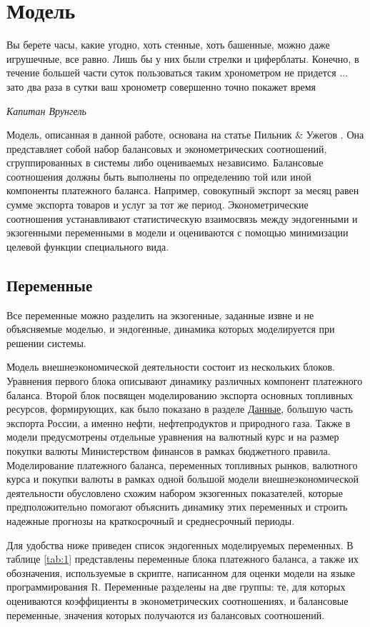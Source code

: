 \documentclass[a4paper, 14pt]{extarticle}
\begin{document}
\newpage
\section{Модель}
\epigraph{Вы берете часы, какие угодно, хоть стенные, хоть башенные, можно даже игрушечные, все равно. Лишь бы у них были стрелки и циферблаты. Конечно, в течение большей части суток пользоваться таким хронометром не придется ... зато два раза в сутки ваш хронометр совершенно точно покажет время}{\textit{Капитан Врунгель}}
Модель, описанная в данной работе, основана на статье Пильник $\&$ Ужегов \autocite{пильник2017модель}. 
Она представляет собой набор балансовых и эконометрических соотношений, сгруппированных в системы либо оцениваемых независимо. 
Балансовые соотношения должны быть выполнены по определению той или иной компоненты платежного баланса. 
Например, совокупный экспорт за месяц равен сумме экспорта товаров и услуг за тот же период.
Эконометрические соотношения устанавливают статистическую взаимосвязь между эндогенными и экзогенными переменными в модели и оцениваются с помощью минимизации целевой функции специального вида.

\subsection{Переменные}

Все переменные можно разделить на экзогенные, заданные извне и не объясняемые моделью, и эндогенные, динамика которых моделируется при решении системы.

Модель внешнеэкономической деятельности состоит из нескольких блоков.
Уравнения первого блока описывают динамику различных компонент платежного баланса. 
Второй блок посвящен моделированию экспорта основных топливных ресурсов, формирующих, как было показано в разделе \hyperref[sub:data]{Данные}, большую часть экспорта России, а именно нефти, нефтепродуктов и природного газа.
Также в модели предусмотрены отдельные уравнения на валютный курс и на размер покупки валюты Министерством финансов в рамках бюджетного правила.
Моделирование платежного баланса, переменных топливных рынков, валютного курса и покупки валюты в рамках одной большой модели внешнеэкономической деятельности обусловлено схожим набором экзогенных показателей, которые предположительно помогают объяснить динамику этих переменных и строить надежные прогнозы на краткосрочный и среднесрочный периоды.

Для удобства ниже приведен список эндогенных моделируемых переменных. 
В таблице \ref{tab:1} представлены переменные блока платежного баланса, а также их обозначения, используемые в скрипте, написанном для оценки модели на языке программирования R.
Переменные разделены на две группы: те, для которых оцениваются коэффициенты в эконометрических соотношениях, и балансовые переменные, значения которых получаются из балансовых соотношений.
\end{document}
